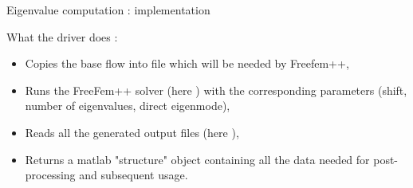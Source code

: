 \documentclass{beamer}
\newcommand{\ssp}{\vspace{.2cm} }
\begin{document}
\begin{frame}{Eigenvalue computation : implementation}

\small






\ssp

What the  driver does :

\begin{itemize}[<+->]
\item Copies the base flow into file  which will be needed by Freefem++,

\item Runs the FreeFem++ solver (here )  with the corresponding parameters (shift, number of eigenvalues, direct eigenmode),


\item Reads all the generated output files (here ), 

\item Returns a matlab "structure" object containing all the data needed for post-processing and subsequent usage.
 
\end{itemize}

\end{frame}
\end{document}
